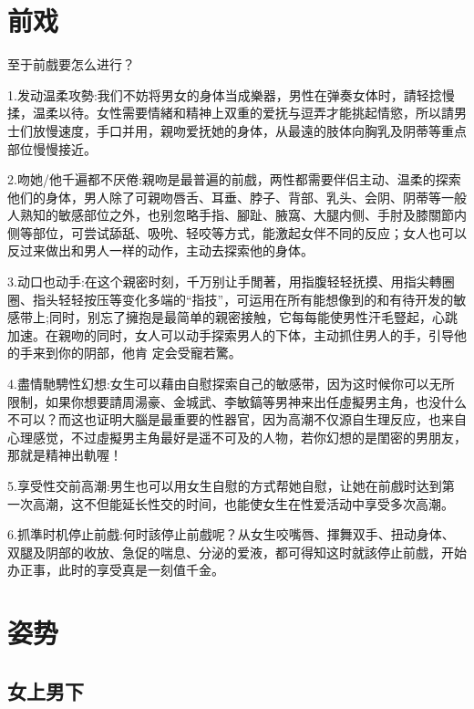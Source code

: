 \documentclass[12pt,UTF8]{ctexbook}
\begin{document}
\chapter{前戏}

至于前戲要怎么进行？

1.发动温柔攻勢:我们不妨将男女的身体当成樂器，男性在弹奏女体时，請轻捻慢揉，温柔以待。女性需要情緒和精神上双重的爱抚与逗弄才能挑起情慾，所以請男士们放慢速度，手口并用，親吻爱抚她的身体，从最遠的肢体向胸乳及阴蒂等重点部位慢慢接近。

2.吻她/他千遍都不厌倦:親吻是最普遍的前戲，两性都需要伴侣主动、温柔的探索他们的身体，男人除了可親吻唇舌、耳垂、脖子、背部、乳头、会阴、阴蒂等一般人熟知的敏感部位之外，也别忽略手指、腳趾、腋窩、大腿内侧、手肘及膝關節内侧等部位，可尝试舔舐、吸吮、轻咬等方式，能激起女伴不同的反应；女人也可以反过来做出和男人一样的动作，主动去探索他的身体。

3.动口也动手:在这个親密时刻，千万别让手閒著，用指腹轻轻抚摸、用指尖轉圈圈、指头轻轻按压等变化多端的“指技”，可运用在所有能想像到的和有待开发的敏感带上;同时，别忘了擁抱是最简单的親密接触，它每每能使男性汗毛豎起，心跳加速。在親吻的同时，女人可以动手探索男人的下体，主动抓住男人的手，引导他的手来到你的阴部，他肯
定会受寵若驚。

4.盡情馳騁性幻想:女生可以藉由自慰探索自己的敏感带，因为这时候你可以无所限制，如果你想要請周湯豪、金城武、李敏鎬等男神来出任虛擬男主角，也没什么不可以？而这也证明大腦是最重要的性器官，因为高潮不仅源自生理反应，也来自心理感觉，不过虛擬男主角最好是遥不可及的人物，若你幻想的是閨密的男朋友，那就是精神出軌喔！

5.享受性交前高潮:男生也可以用女生自慰的方式帮她自慰，让她在前戲时达到第一次高潮，这不但能延长性交的时间，也能使女生在性爱活动中享受多次高潮。

6.抓準时机停止前戲:何时該停止前戲呢？从女生咬嘴唇、揮舞双手、扭动身体、双腿及阴部的收放、急促的喘息、分泌的爱液，都可得知这时就該停止前戲，开始办正事，此时的享受真是一刻值千金。

\chapter{姿势}

\section{女上男下}
\end{document}
